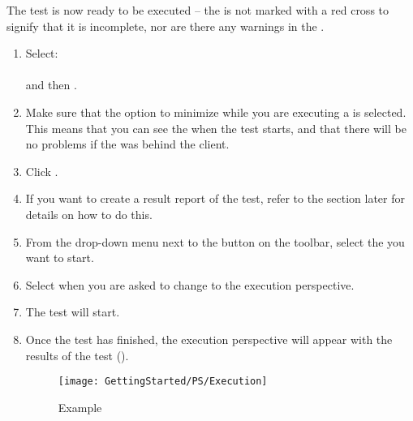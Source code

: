 The test is now ready to be executed -- the \gdsuite{} is not marked with a red cross to signify that it is incomplete, nor are there any warnings in the \gdprobview{}. 

\begin{enumerate}
\item Select:\\  \\
and then . 
\item Make sure that the option  to minimize \jb{} while you are executing a \gdsuite{} is selected. This means that you can see the \gdaut{} when the test starts, and that there will be no problems if the \gdaut{} was behind the \jb{} client. 
\item Click . 
\item If you want to create a result report of the test, refer to the section later  for details on how to do this. 
\item From the drop-down menu next to the  button on the toolbar, select the \gdsuite{} you want to start. 
\item Select  when you are asked to change to the execution perspective. 
\item The test will start.
\item Once the test has finished, the execution perspective will appear with the results of the test ().
\begin{figure}[h]
\texttt{[image: GettingStarted/PS/Execution]}
\caption{Example \gdsuite{}}
\label{Testshot}
\end{figure}



 \end{enumerate}
